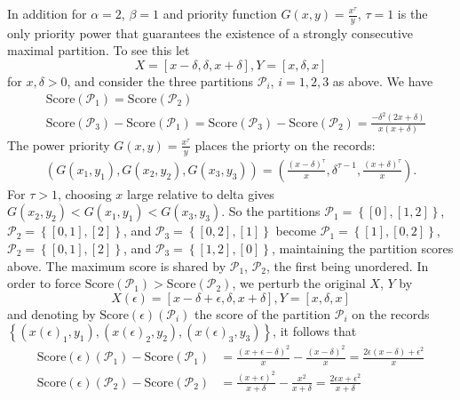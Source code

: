 \documentclass{article}
\theoremstyle{case}
\begin{document}
In addition for $\alpha = 2$, $\beta = 1$ and priority function $G\left( x,y\right) = \frac{x^{\tau}}{y}$, $\tau = 1$ is the only priority power that guarantees the existence of a strongly consecutive maximal partition. To see this let
\[
X = \left[ x-\delta, \delta, x + \delta\right], Y = \left[ x, \delta, x\right]
\] 
for $x, \delta > 0$, and consider the three partitions $\mathcal{P}_i$, $i=1, 2, 3$ as above. We have
\begin{align*}
& \text{Score}\left(\mathcal{P}_1\right) = \text{Score}\left(\mathcal{P}_2\right) \\
& \text{Score}\left(\mathcal{P}_3\right) - \text{Score}\left(\mathcal{P}_1\right) = \text{Score}\left(\mathcal{P}_3\right) - \text{Score}\left(\mathcal{P}_2\right) = \frac{-\delta^2\left( 2x + \delta\right)}{x\left( x + \delta\right)}
\end{align*}
The power priority $G(x,y) = \frac{x^\tau}{y}$ places the priorty on the records:
\begin{align} \label{eq8}
\left( G(x_1, y_1), G(x_2, y_2), G(x_3, y_3)\right) = \left( \frac{\left( x - \delta \right)^{\tau}}{x}, \delta^{\tau-1},  \frac{\left( x + \delta \right)^{\tau}}{x}\right).
\end{align}
For $\tau > 1$, choosing $x$ large relative to delta gives $G(x_2, y_2) < G(x_1, y_1) < G(x_3, y_3)$. So the partitions $\mathcal{P}_1 = \left\lbrace \left[ 0 \right], \left[ 1, 2\right]\right\rbrace$, $\mathcal{P}_2 = \left\lbrace \left[ 0, 1 \right], \left[ 2\right]\right\rbrace$, and $\mathcal{P}_3 = \left\lbrace \left[ 0, 2 \right], \left[ 1 \right]\right\rbrace$ become $\mathcal{P}_1 = \left\lbrace \left[ 1 \right], \left[ 0, 2\right]\right\rbrace$, $\mathcal{P}_2 = \left\lbrace \left[ 0, 1 \right], \left[ 2\right]\right\rbrace$, and $\mathcal{P}_3 = \left\lbrace \left[ 1, 2 \right], \left[ 0 \right]\right\rbrace$, maintaining the partition scores above. The maximum score is shared by $\mathcal{P}_1$, $\mathcal{P}_2$, the first being unordered. In order to force $\text{Score}\left(\mathcal{P}_1\right) > \text{Score}\left(\mathcal{P}_2\right)$, we perturb the original $X$, $Y$ by
\[
X\left(\epsilon\right) = \left[ x-\delta+\epsilon, \delta, x + \delta\right], Y = \left[ x, \delta, x\right]
\]
and denoting by $\text{Score}\left(\epsilon \right)\left(\mathcal{P}_i \right)$ the score of the partition $\mathcal{P}_i$ on the records $\left\lbrace \left(x\left(\epsilon\right)_1, y_1\right),\left(x\left(\epsilon\right)_2, y_2\right),\left(x\left(\epsilon\right)_3, y_3\right) \right\rbrace$, it follows that
\begin{align*}
\text{Score}\left(\epsilon \right)\left(\mathcal{P}_1 \right) - \text{Score}\left(\mathcal{P}_1 \right) &= \frac{\left( x + \epsilon - \delta\right)^2}{x} - \frac{\left( x - \delta\right)^2}{x} = \frac{2\epsilon\left( x - \delta\right) + \epsilon^2}{x} \\
\text{Score}\left(\epsilon \right)\left(\mathcal{P}_2 \right) - \text{Score}\left(\mathcal{P}_2 \right) &= \frac{\left( x + \epsilon\right)^2}{x + \delta}  - \frac{x^2}{x+\delta}= \frac{2\epsilon x + \epsilon^2}{x+\delta}
\end{align*}
\end{document}
